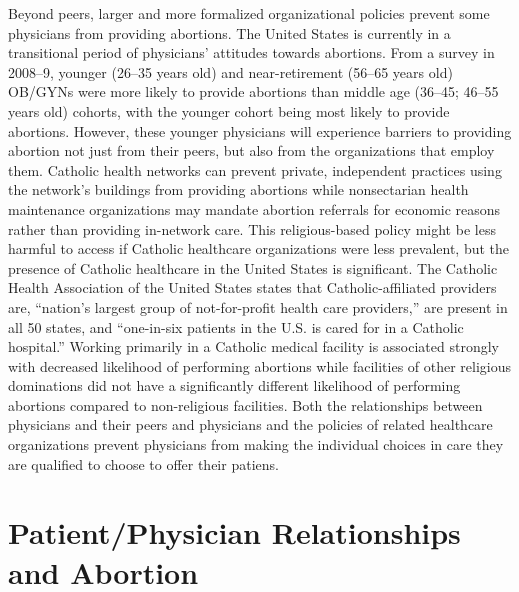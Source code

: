 \documentclass[letterpaper, 12pt]{article}
\begin{document}
Beyond peers, larger and more formalized organizational policies prevent some physicians from providing abortions.
The United States is currently in a transitional period of physicians' attitudes towards abortions.
From a survey in 2008--9, younger (26--35 years old) and near-retirement (56--65 years old) OB/GYNs were more likely to provide abortions than middle age (36--45; 46--55 years old) cohorts, with the younger cohort being most likely to provide abortions. \autocite[pg. 611]{stulberg_abortion_2011}
However, these younger physicians will experience barriers to providing abortion not just from their peers, but also from the organizations that employ them.
Catholic health networks can prevent private, independent practices using the network's buildings from providing abortions while nonsectarian health maintenance organizations may mandate abortion referrals for economic reasons rather than providing in-network care. \autocite[pg. 149]{freedman_obstacles_2010}
This religious-based policy might be less harmful to access if Catholic healthcare organizations were less prevalent, but the presence of Catholic healthcare in the United States is significant.
The Catholic Health Association of the United States states that Catholic-affiliated providers are, ``nation’s largest group of not-for-profit health care providers,'' are present in all 50 states, and ``one-in-six patients in the U.S. is cared for in a Catholic hospital.''  \autocite{the_catholic_health_association_of_the_united_states_catholic_2016}
Working primarily in a Catholic medical facility is associated strongly with decreased likelihood of performing abortions while facilities of other religious dominations did not have a significantly different likelihood of performing abortions compared to non-religious facilities. \autocite[pg. 612]{stulberg_abortion_2011}
Both the relationships between physicians and their peers and physicians and the policies of related healthcare organizations prevent physicians from making the individual choices in care they are qualified to choose to offer their patiens.

\section*{Patient/Physician Relationships and Abortion}
\end{document}
